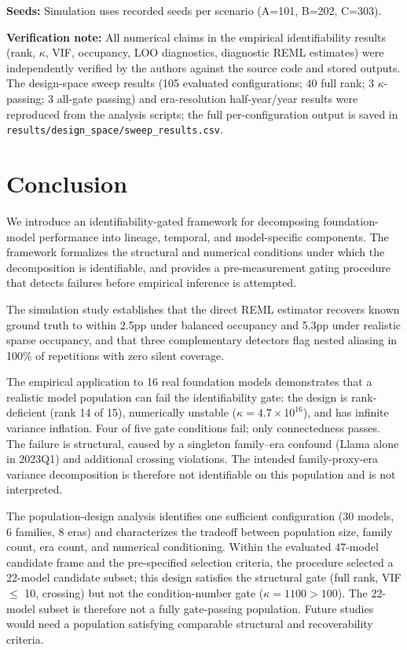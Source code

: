 \documentclass{ieeeaccess}
\theoremstyle{definition}
\theoremstyle{plain}
\begin{document}
\textbf{Seeds:} Simulation uses recorded seeds per scenario (A=101, B=202, C=303).

\textbf{Verification note:} All numerical claims in the empirical identifiability results (rank, $\kappa$, VIF, occupancy, LOO diagnostics, diagnostic REML estimates) were independently verified by the authors against the source code and stored outputs. The design-space sweep results (105 evaluated configurations; 40 full rank; 3 $\kappa$-passing; 3 all-gate passing) and era-resolution half-year/year results were reproduced from the analysis scripts; the full per-configuration output is saved in \texttt{results/design\_space/sweep\_results.csv}.

\section{Conclusion}
\label{sec:conclusion}

We introduce an identifiability-gated framework for decomposing foundation-model performance into lineage, temporal, and model-specific components. The framework formalizes the structural and numerical conditions under which the decomposition is identifiable, and provides a pre-measurement gating procedure that detects failures before empirical inference is attempted.

The simulation study establishes that the direct REML estimator recovers known ground truth to within 2.5pp under balanced occupancy and 5.3pp under realistic sparse occupancy, and that three complementary detectors flag nested aliasing in 100\% of repetitions with zero silent coverage.

The empirical application to 16 real foundation models demonstrates that a realistic model population can fail the identifiability gate: the design is rank-deficient (rank 14 of 15), numerically unstable ($\kappa = 4.7 \times 10^{16}$), and has infinite variance inflation. Four of five gate conditions fail; only connectedness passes. The failure is structural, caused by a singleton family--era confound (Llama alone in 2023Q1) and additional crossing violations. The intended family-proxy-era variance decomposition is therefore not identifiable on this population and is not interpreted.

The population-design analysis identifies one sufficient configuration (30 models, 6 families, 8 eras) and characterizes the tradeoff between population size, family count, era count, and numerical conditioning. Within the evaluated 47-model candidate frame and the pre-specified selection criteria, the procedure selected a 22-model candidate subset; this design satisfies the structural gate (full rank, VIF $\leq$ 10, crossing) but not the condition-number gate ($\kappa = 1100 > 100$). The 22-model subset is therefore not a fully gate-passing population. Future studies would need a population satisfying comparable structural and recoverability criteria.
\end{document}
